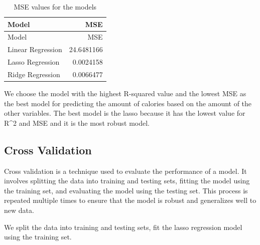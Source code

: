 \documentclass[
]{article}
\newenvironment{Shaded}{\begin{snugshade}}{\end{snugshade}}
\newcommand{\AttributeTok}[1]{\textcolor[rgb]{0.13,0.29,0.53}{#1}}
\newcommand{\ConstantTok}[1]{\textcolor[rgb]{0.56,0.35,0.01}{#1}}
\newcommand{\DecValTok}[1]{\textcolor[rgb]{0.00,0.00,0.81}{#1}}
\newcommand{\FloatTok}[1]{\textcolor[rgb]{0.00,0.00,0.81}{#1}}
\newcommand{\FunctionTok}[1]{\textcolor[rgb]{0.13,0.29,0.53}{\textbf{#1}}}
\newcommand{\NormalTok}[1]{#1}
\newcommand{\OtherTok}[1]{\textcolor[rgb]{0.56,0.35,0.01}{#1}}
\newcommand{\SpecialCharTok}[1]{\textcolor[rgb]{0.81,0.36,0.00}{\textbf{#1}}}
\begin{document}
\begin{longtable}[]{@{}lr@{}}
\caption{MSE values for the models}\tabularnewline
\toprule\noalign{}
Model & MSE \\
\midrule\noalign{}
\endfirsthead
\toprule\noalign{}
Model & MSE \\
\midrule\noalign{}
\endhead
\bottomrule\noalign{}
\endlastfoot
Linear Regression & 24.6481166 \\
Lasso Regression & 0.0024158 \\
Ridge Regression & 0.0066477 \\
\end{longtable}

We choose the model with the highest R-squared value and the lowest MSE
as the best model for predicting the amount of calories based on the
amount of the other variables. The best model is the lasso because it
has the lowest value for R\^{}2 and MSE and it is the most robust model.

\hypertarget{cross-validation}{%
\subsection{Cross Validation}\label{cross-validation}}

Cross validation is a technique used to evaluate the performance of a
model. It involves splitting the data into training and testing sets,
fitting the model using the training set, and evaluating the model using
the testing set. This process is repeated multiple times to ensure that
the model is robust and generalizes well to new data.

We split the data into training and testing sets, fit the lasso
regression model using the training set.

\begin{Shaded}
\end{Shaded}
\end{document}
